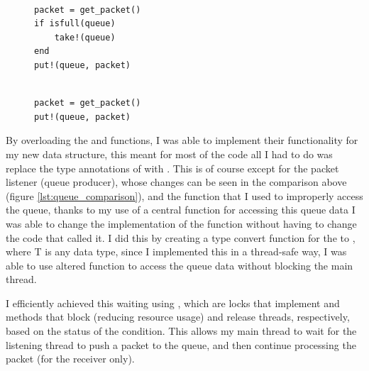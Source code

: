 \begin{figure}[!h]
    \begin{minipage}{0.5\textwidth}
        \centering
        \begin{verbatim}

packet = get_packet()
if isfull(queue)
    take!(queue)
end
put!(queue, packet)

        \end{verbatim}
    \end{minipage}
    \begin{minipage}{0.5\textwidth}
        \centering
        \begin{verbatim}

packet = get_packet()
put!(queue, packet)

        \end{verbatim}
    \end{minipage}
\end{figure}
\label{lst:queue_comparison}

By overloading the  and  functions, I was able to implement their functionality for my new data structure, this meant for most of the code all I had to do was replace the type annotations of  with . This is of course except for the packet listener (queue producer), whose changes can be seen in the comparison above (figure \ref{lst:queue_comparison}), and the  function that I used to improperly access the queue, thanks to my use of a central function for accessing this queue data I was able to change the implementation of the function without having to change the code that called it. I did this by creating a type convert function for the  to , where T is any data type, since I implemented this in a thread-safe way, I was able to use altered  function to access the queue data without blocking the main thread.

I efficiently achieved this waiting using , which are locks that implement  and  methods that block (reducing resource usage) and release threads, respectively, based on the status of the condition. This allows my main thread to wait for the listening thread to push a packet to the queue, and then continue processing the packet (for the receiver only).


